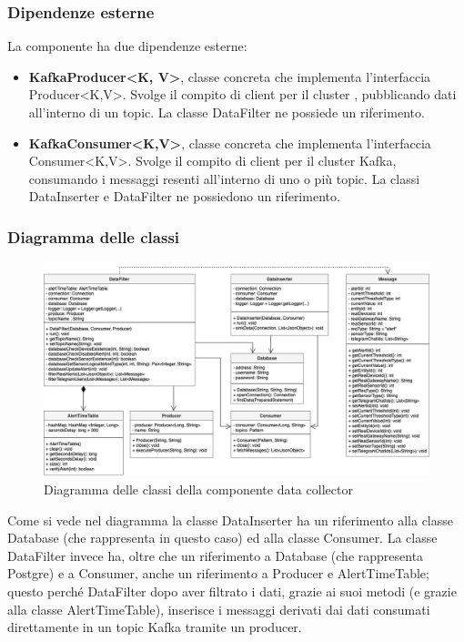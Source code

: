 		\subsubsection{Dipendenze esterne}
			La componente ha due dipendenze esterne:
			\begin{itemize}
				\item \textbf{KafkaProducer<K, V>}, classe concreta che implementa l'interfaccia Producer<K,V>. Svolge il compito di client per il cluster , pubblicando dati all'interno di un topic. La classe DataFilter ne possiede un riferimento.
				\item \textbf{KafkaConsumer<K,V>}, classe concreta che implementa l'interfaccia Consumer<K,V>. Svolge il compito di client per il cluster Kafka, consumando i messaggi resenti all'interno di uno o più topic. La classi DataInserter e DataFilter ne possiedono un riferimento.	
			\end{itemize}	
		\begin{landscape}
		\subsubsection{Diagramma delle classi}%
			\begin{figure}[H]
				\centering
				\includegraphics[scale=0.550]{res/images/DATACOLLECTOR/ClassikafkaDataCollector.png}
				\caption{Diagramma delle classi della componente data collector}
				\label{Diagramma 6}
			\end{figure}
		Come si vede nel diagramma la classe DataInserter ha un riferimento alla classe Database (che rappresenta  in questo caso) ed alla classe Consumer.
		\newline
		La classe DataFilter invece ha, oltre che un riferimento a Database (che rappresenta Postgre) e a Consumer, anche un riferimento a Producer e AlertTimeTable; questo perché DataFilter dopo aver filtrato i dati, grazie ai suoi metodi (e grazie alla classe AlertTimeTable), inserisce i messaggi derivati dai dati consumati direttamente in un topic Kafka tramite un producer.  
		\end{landscape}
